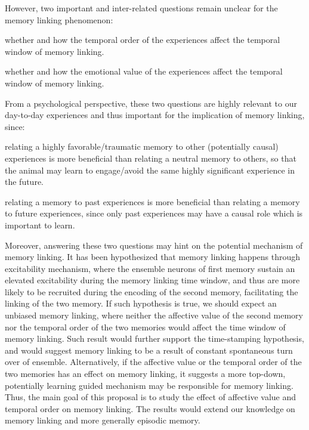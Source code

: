 \documentclass[master.tex]{subfiles}
\begin{document}
However, two important and inter-related questions remain unclear for the
memory linking phenomenon:
\begin{inparaenum}[a)] \bfseries
\item whether and how the temporal order of the experiences affect the temporal
  window of memory linking.
\item whether and how the emotional value of the experiences affect the
  temporal window of memory linking.
\end{inparaenum}
From a psychological perspective, these two questions are highly relevant to our
day-to-day experiences and thus important for the implication of memory linking,
since:
\begin{inparaenum}[a)]
\item relating a highly favorable/traumatic memory to other (potentially causal)
  experiences is more beneficial than relating a neutral memory to others, so
  that the animal may learn to engage/avoid the same highly significant
  experience in the future.
\item relating a memory to past experiences is more beneficial than relating a
  memory to future experiences, since only past experiences may have a causal
  role which is important to learn.
\end{inparaenum}
Moreover, answering these two questions may hint on the potential mechanism of
memory linking. It has been hypothesized that memory linking happens through
excitability mechanism, where the ensemble neurons of first memory sustain an
elevated excitability during the memory linking time window, and thus are more
likely to be recruited during the encoding of the second memory, facilitating
the linking of the two memory. If such hypothesis is true, we should expect an
unbiased memory linking, where neither the affective value of the second memory
nor the temporal order of the two memories would affect the time window of
memory linking. Such result would further support the time-stamping hypothesis,
and would suggest memory linking to be a result of constant spontaneous turn
over of ensemble. Alternatively, if the affective value or the temporal order of
the two memories has an effect on memory linking, it suggests a more top-down,
potentially learning guided mechanism may be responsible for memory linking.
Thus, the main goal of this proposal is to study the effect of affective value
and temporal order on memory linking. The results would extend our knowledge on
memory linking and more generally episodic memory.
\end{document}
